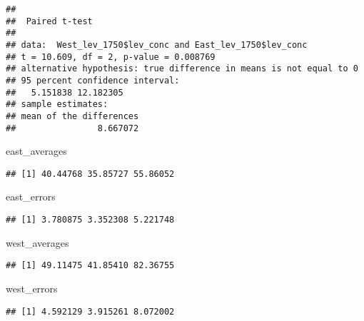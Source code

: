 \documentclass[]{article}
\newenvironment{Shaded}{\begin{snugshade}}{\end{snugshade}}
\newcommand{\NormalTok}[1]{#1}
\begin{document}
\begin{verbatim}
## 
##  Paired t-test
## 
## data:  West_lev_1750$lev_conc and East_lev_1750$lev_conc
## t = 10.609, df = 2, p-value = 0.008769
## alternative hypothesis: true difference in means is not equal to 0
## 95 percent confidence interval:
##   5.151838 12.182305
## sample estimates:
## mean of the differences 
##                8.667072
\end{verbatim}

\begin{Shaded}
\begin{Highlighting}[]
\NormalTok{east_averages}
\end{Highlighting}
\end{Shaded}

\begin{verbatim}
## [1] 40.44768 35.85727 55.86052
\end{verbatim}

\begin{Shaded}
\begin{Highlighting}[]
\NormalTok{east_errors}
\end{Highlighting}
\end{Shaded}

\begin{verbatim}
## [1] 3.780875 3.352308 5.221748
\end{verbatim}

\begin{Shaded}
\begin{Highlighting}[]
\NormalTok{west_averages}
\end{Highlighting}
\end{Shaded}

\begin{verbatim}
## [1] 49.11475 41.85410 82.36755
\end{verbatim}

\begin{Shaded}
\begin{Highlighting}[]
\NormalTok{west_errors}
\end{Highlighting}
\end{Shaded}

\begin{verbatim}
## [1] 4.592129 3.915261 8.072002
\end{verbatim}
\end{document}
